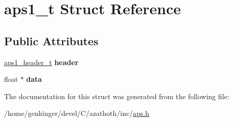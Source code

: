 \hypertarget{structaps1__t}{}\section{aps1\+\_\+t Struct Reference}
\label{structaps1__t}
\subsection*{Public Attributes}
\begin{DoxyCompactItemize}
\item 
\mbox{\label{structaps1__t_a77495e33f0f1f3fbadceeab90b624494}} 
\mbox{\hyperlink{structaps1__header__t}{aps1\+\_\+header\+\_\+t}} {\bfseries header}
\item 
\mbox{\label{structaps1__t_a0966c340f7217f57376f1c1fe0132688}} 
float $\ast$ {\bfseries data}
\end{DoxyCompactItemize}


The documentation for this struct was generated from the following file\+:\begin{DoxyCompactItemize}
\item 
/home/genkinger/devel/\+C/azathoth/inc/\mbox{\hyperlink{aps_8h}{aps.\+h}}\end{DoxyCompactItemize}
